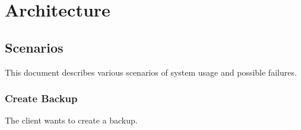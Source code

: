 
\section{Architecture}\label{sec:architecture}

\subsection{Scenarios}
\label{sec:scenarios}
This document describes various scenarios of system usage and possible failures.

\subsubsection{Create Backup}\label{sec:scenario-create-backup}
The client wants to create a backup.

